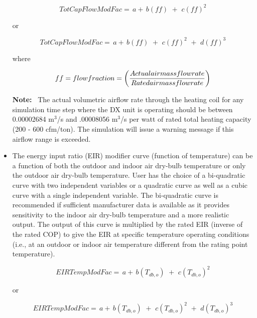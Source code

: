 \begin{itemize}
\begin{equation}
TotCapFlowModFac = \,a + \,b\left( {ff} \right)\,\, + \,\,c{\left( {ff} \right)^2}
\end{equation}

or

\begin{equation}
TotCapFlowModFac = \,a + \,b\left( {ff} \right)\,\, + \,\,c{\left( {ff} \right)^2}\,\, + \,\,d{\left( {ff} \right)^3}
\end{equation}

where

\begin{equation}
ff = flow{\rm{ }}fraction = \left( {\frac{{Actual{\rm{ }}air{\rm{ }}mass{\rm{ }}flow{\rm{ }}rate}}{{Rated{\rm{ }}air{\rm{ }}mass{\rm{ }}flow{\rm{ }}rate}}} \right)
\end{equation}

\textbf{Note:}~ The actual volumetric airflow rate through the heating coil for any simulation time step where the DX unit is operating should be between 0.00002684 m\(^{3}\)/s and .00008056 m\(^{3}\)/s per watt of rated total heating capacity (200 - 600 cfm/ton). The simulation will issue a warning message if this airflow range is exceeded.

  \item
The energy input ratio (EIR) modifier curve (function of temperature) can be a function of both the outdoor and indoor air dry-bulb temperature or only the outdoor air dry-bulb temperature. User has the choice of a bi-quadratic curve with two independent variables or a quadratic curve as well as a cubic curve with a single independent variable. The bi-quadratic curve is recommended if sufficient manufacturer data is available as it provides sensitivity to the indoor air dry-bulb temperature and a more realistic output. The output of this curve is multiplied by the rated EIR (inverse of the rated COP) to give the EIR at specific temperature operating conditions (i.e., at an outdoor or indoor air temperature different from the rating point temperature).

\begin{equation}
EIRTempModFac = \,a + \,b\left( {{T_{db,o}}} \right)\,\, + \,\,c{\left( {{T_{db,o}}} \right)^2}
\end{equation}

or

\begin{equation}
EIRTempModFac = \,a + \,b\left( {{T_{db,o}}} \right)\,\, + \,\,c{\left( {{T_{db,o}}} \right)^2}\,\, + \,\,d{\left( {{T_{db,o}}} \right)^3}
\end{equation}


\end{itemize}
